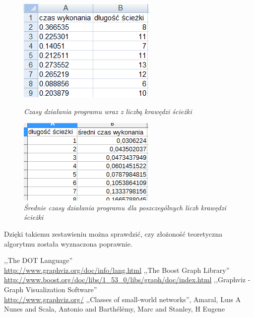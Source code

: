 \documentclass[a4paper, 12pt]{article}
\begin{document}
\begin{figure}[ht]
\begin{minipage}[b]{0.45\linewidth}
\centering
\includegraphics[width=\textwidth]{tabela1.png}
\caption{\em Czasy działania programu wraz z liczbą krawędzi ścieżki}
\label{fig:tabela1}
\end{minipage}
\hspace{0.5cm}
\begin{minipage}[b]{0.45\linewidth}
\centering
\includegraphics[width=\textwidth]{tabela2.png}
\caption{\em Średnie czasy działania programu dla poszczególnych liczb krawędzi ścieżki}
\label{fig:tabela2}
\end{minipage}
\end{figure}

Dzięki takiemu zestawieniu można sprawdzić, czy złożoność teoretyczna algorytmu została wyznaczona poprawnie.

\begin{thebibliography}{}
 ,,The DOT Language'' \\ \url{http://www.graphviz.org/doc/info/lang.html}
 ,,The Boost Graph Library'' \\ \url{http://www.boost.org/doc/libs/1_53_0/libs/graph/doc/index.html}
 ,,Graphviz - Graph Visualization Software'' \\ \url{http://www.graphviz.org/}
 ,,Classes of small-world networks'', Amaral, Lu{\i}s A Nunes and Scala, Antonio and Barth{\'e}l{\'e}my, Marc and Stanley, H Eugene
\end{thebibliography}
\end{document}
